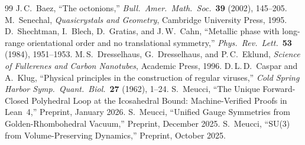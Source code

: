 \documentclass[11pt,letterpaper]{article}
\theoremstyle{definition}
\begin{document}
\begin{thebibliography}{99}
J.\,C.~Baez, ``The octonions,''
\emph{Bull.\ Amer.\ Math.\ Soc.}\ \textbf{39} (2002), 145--205.
M.~Senechal, \emph{Quasicrystals and Geometry}, Cambridge University Press, 1995.
D.~Shechtman, I.~Blech, D.~Gratias, and J.\,W.~Cahn,
``Metallic phase with long-range orientational order and no translational symmetry,''
\emph{Phys.\ Rev.\ Lett.}\ \textbf{53} (1984), 1951--1953.
M.\,S.~Dresselhaus, G.~Dresselhaus, and P.\,C.~Eklund,
\emph{Science of Fullerenes and Carbon Nanotubes}, Academic Press, 1996.
D.\,L.\,D.~Caspar and A.~Klug,
``Physical principles in the construction of regular viruses,''
\emph{Cold Spring Harbor Symp.\ Quant.\ Biol.}\ \textbf{27} (1962), 1--24.
S.~Meucci, ``The Unique Forward-Closed Polyhedral Loop at the Icosahedral Bound: Machine-Verified Proofs in Lean~4,'' Preprint, January 2026.
S.~Meucci, ``Unified Gauge Symmetries from Golden-Rhombohedral Vacuum,'' Preprint, December 2025.
S.~Meucci, ``SU(3) from Volume-Preserving Dynamics,'' Preprint, October 2025.
\end{thebibliography}
\end{document}
